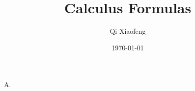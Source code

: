 \documentclass{article}
\title{Calculus Formulas}
\author{Qi Xiaofeng}
\date{\today}
\begin{document}
A.
\end{document}
